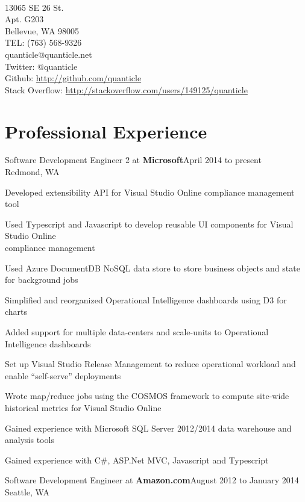 \documentclass[letterpaper]{article}
\newenvironment{resume-list}
{\begin{itemize}
 \setlength{\itemsep}{0pt}
 \setlength{\parskip}{0pt}}
{\end{itemize}}
\begin{document}
\\
{\small 13065 SE 26\raisebox{0.25em}{th} St.}\\
{\small Apt. G203}\\
{\small Bellevue, WA 98005}\\
{\small TEL: (763) 568-9326}\\
{\small quanticle@quanticle.net}\\
{\small Twitter: @quanticle}\\
{\small Github: \url{http://github.com/quanticle}}\\
{\small Stack Overflow: \url{http://stackoverflow.com/users/149125/quanticle}}
\section*{Professional Experience}
\noindent Software Development Engineer 2 at {\bfseries Microsoft}\dotfill April 2014 to present\\
Redmond, WA
\begin{resume-list}
\item Developed extensibility API for Visual Studio Online compliance management tool
\item Used Typescript and Javascript to develop reusable UI components for Visual Studio Online\\
      compliance management
\item Used Azure DocumentDB NoSQL data store to store business objects and state for background jobs
\item Simplified and reorganized Operational Intelligence dashboards using D3 for charts
\item Added support for multiple data-centers and scale-units to Operational Intelligence dashboards
\item Set up Visual Studio Release Management to reduce operational workload and enable ``self-serve'' deployments
\item Wrote map/reduce jobs using the COSMOS framework to compute site-wide historical metrics for Visual Studio Online
\item Gained experience with Microsoft SQL Server 2012/2014 data warehouse and analysis tools
\item Gained experience with C\#, ASP.Net MVC, Javascript and Typescript
\end{resume-list}
\noindent Software Development Engineer at {\bfseries Amazon.com}\dotfill August 2012 to January 2014\\
Seattle, WA
\end{document}
